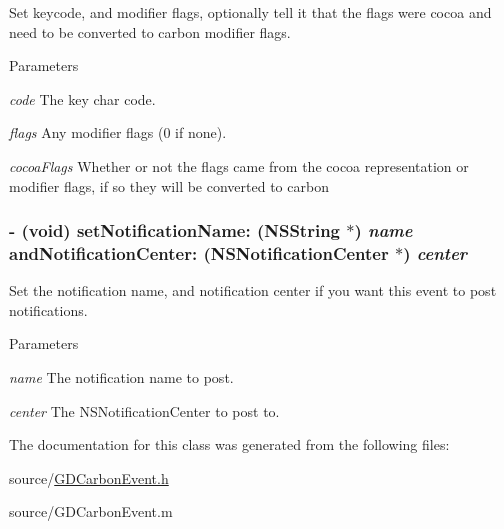 Set keycode, and modifier flags, optionally tell it that the flags were cocoa and need to be converted to carbon modifier flags. 
\begin{DoxyParams}{Parameters}
\item[{\em code}]The key char code. \item[{\em flags}]Any modifier flags (0 if none). \item[{\em cocoaFlags}]Whether or not the flags came from the cocoa representation or modifier flags, if so they will be converted to carbon \end{DoxyParams}
\hypertarget{interface_g_d_carbon_event_a33e3feb0ec56180d02e170e8bf213b6c}{
\subsubsection[{setNotificationName:andNotificationCenter:}]{\setlength{\rightskip}{0pt plus 5cm}-\/ (void) setNotificationName: (NSString $\ast$) {\em name}\/ andNotificationCenter: (NSNotificationCenter $\ast$) {\em center}}}
\label{interface_g_d_carbon_event_a33e3feb0ec56180d02e170e8bf213b6c}


Set the notification name, and notification center if you want this event to post notifications. 
\begin{DoxyParams}{Parameters}
\item[{\em name}]The notification name to post. \item[{\em center}]The NSNotificationCenter to post to. \end{DoxyParams}


The documentation for this class was generated from the following files:\begin{DoxyCompactItemize}
\item 
source/\hyperlink{_g_d_carbon_event_8h}{GDCarbonEvent.h}\item 
source/GDCarbonEvent.m\end{DoxyCompactItemize}
